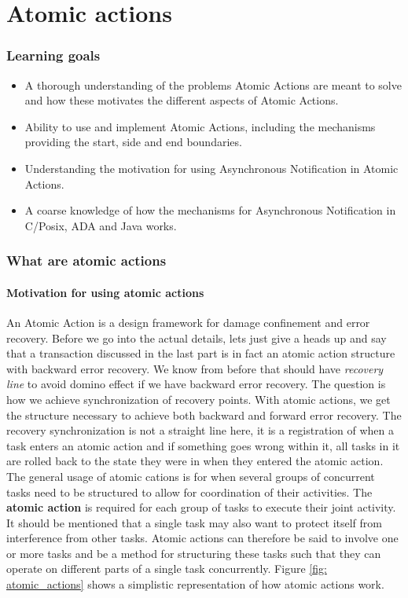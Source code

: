 \part{Atomic actions}
\section{Learning goals}
\begin{itemize}
\item  A thorough understanding of the problems Atomic Actions are meant to solve and how these motivates the different aspects of Atomic Actions.
\item Ability to use and implement Atomic Actions, including the mechanisms providing the start, side and end boundaries.
\item Understanding the motivation for using Asynchronous Notification in Atomic Actions.
\item A coarse knowledge of how the mechanisms for Asynchronous Notification in C/Posix, ADA and Java works.
\end{itemize}

\section{What are atomic actions}
\subsection{Motivation for using atomic actions}
An Atomic Action is a design framework for damage confinement and error recovery. Before we go into the actual details, lets just give a heads up and say that a transaction discussed in the last part is in fact an atomic action structure with backward error recovery. We know from before that should have \textit{recovery line} to avoid domino effect if we have backward error recovery. The question is how we achieve synchronization of recovery points. With atomic actions, we get the structure necessary to achieve both backward and forward error recovery. The recovery synchronization is not a straight line here, it is a registration of when a task enters an atomic action and if something goes wrong within it, all tasks in it are rolled back to the state they were in when they entered the atomic action. The general usage of atomic cations is for when several groups of concurrent tasks need to be structured to allow for coordination of their activities. The \textbf{atomic action} is required for each group of tasks to execute their joint activity. It should be mentioned that a single task may also want to protect itself from interference from other tasks. Atomic actions can therefore be said to involve one or more tasks and be a method for structuring these tasks such that they can operate on different parts of a single task concurrently. Figure \ref{fig: atomic_actions} shows a simplistic representation of how atomic actions work.

